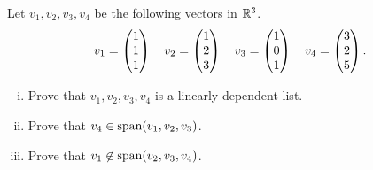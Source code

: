 \begin{question}\label{que:LinDepInR3}
    \normalfont


    Let $v_1, v_2, v_3, v_4$ be the following vectors in ${\mathbb R}^3$.
    \begin{align*}
        v_1 = \begin{pmatrix} 1\\ 1\\ 1\end{pmatrix}\ \ \
        v_2 = \begin{pmatrix} 1\\ 2\\ 3\end{pmatrix}\ \ \
        v_3 = \begin{pmatrix} 1\\ 0\\ 1\end{pmatrix}\ \ \
        v_4 = \begin{pmatrix} 3\\ 2\\ 5\end{pmatrix}.
    \end{align*}


    \begin{enumerate}[(i)]
        \item Prove that $v_1, v_2, v_3, v_4$ \hspace{.1cm} is a linearly dependent list.
        \item Prove that $v_4\in\textnormal{span}(v_1,v_2,v_3)$.
        \item Prove that $v_1\not\in\textnormal{span}(v_2, v_3, v_4)$.
    \end{enumerate}
\end{question}

